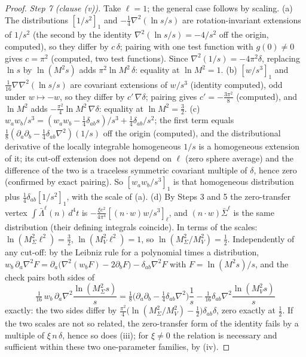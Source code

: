 \begin{proof}
\emph{Step 7 (clause (v)).} Take $\ell = 1$; the general case follows by scaling. (a) The distributions $[1/s^{2}]_{1}$ and $-\frac14\nabla^{2}(\ln s/s)$ are rotation-invariant extensions of $1/s^{2}$ (the second by the identity $\nabla^{2}(\ln s/s) = -4/s^{2}$ off the origin, computed), so they differ by $c\,\delta$; pairing with one test function with $g(0) \neq 0$ gives $c = \pi^{2}$ (computed, two test functions). Since $\nabla^{2}(1/s) = -4\pi^{2}\delta$, replacing $\ln s$ by $\ln(M^{2}s)$ adds $\pi^{2}\ln M^{2}\,\delta$: equality at $\ln M^{2} = 1$. (b) $[w/s^{3}]_{1}$ and $\frac{1}{16}\nabla\nabla^{2}(\ln s/s)$ are covariant extensions of $w/s^{3}$ (identity computed), odd under $w \mapsto -w$, so they differ by $c'\,\nabla\delta$; pairing gives $c' = -\frac{3\pi^{2}}{8}$ (computed), and $\ln M^{2}$ adds $-\frac{\pi^{2}}{4}\ln M^{2}\,\nabla\delta$: equality at $\ln M^{2} = \frac32$. (c) $w_{a}w_{b}/s^{3} = (w_{a}w_{b} - \frac14\delta_{ab}s)/s^{3} + \frac14\delta_{ab}/s^{2}$; the first term equals $\frac18(\partial_{a}\partial_{b} - \frac14\delta_{ab}\nabla^{2})(1/s)$ off the origin (computed), and the distributional derivative of the locally integrable homogeneous $1/s$ is a homogeneous extension of it; its cut-off extension does not depend on $\ell$ (zero sphere average) and the difference of the two is a traceless symmetric covariant multiple of $\delta$, hence zero (confirmed by exact pairing). So $[w_{a}w_{b}/s^{3}]_{1}$ is that homogeneous distribution plus $\frac14\delta_{ab}[1/s^{2}]_{1}$, with the scale of (a). (d) By Steps 3 and 5 the zero-transfer vertex $\int\bar\Lambda^{\ell}(n)\,d^{4}t$ is $-\frac{\xi e^{2}}{4\pi^{4}}[(n\cdot w)w/s^{3}]_{\ell}$, and $(n\cdot w)\bar\Sigma^{\ell}$ is the same distribution (their defining integrals coincide). In terms of the scales: $\ln(M_{\Sigma}^{2}\ell^{2}) = \frac32$, $\ln(M_{V}^{2}\ell^{2}) = 1$, so $\ln(M_{\Sigma}^{2}/M_{V}^{2}) = \frac12$. Independently of any cut-off: by the Leibniz rule for a polynomial times a distribution, $w_{b}\,\partial_{a}\nabla^{2}F = \partial_{a}\big(\nabla^{2}(w_{b}F) - 2\partial_{b}F\big) - \delta_{ab}\nabla^{2}F$ with $F = \ln(M^{2}s)/s$, and the check pairs both sides of
\[
\tfrac{1}{16}\,w_{b}\,\partial_{a}\nabla^{2}\frac{\ln(M_{\Sigma}^{2}s)}{s} = \tfrac18\big(\partial_{a}\partial_{b} - \tfrac14\delta_{ab}\nabla^{2}\big)\frac1s - \tfrac{1}{16}\delta_{ab}\nabla^{2}\frac{\ln(M_{V}^{2}s)}{s}
\]
exactly: the two sides differ by $\frac{\pi^{2}}{4}\big(\ln(M_{\Sigma}^{2}/M_{V}^{2}) - \frac12\big)\delta_{ab}\delta$, zero exactly at $\frac12$. If the two scales are not so related, the zero-transfer form of the identity fails by a multiple of $\xi\,n\,\delta$, hence so does (iii); for $\xi \neq 0$ the relation is necessary and sufficient within these two one-parameter families, by (iv).


\end{proof}
